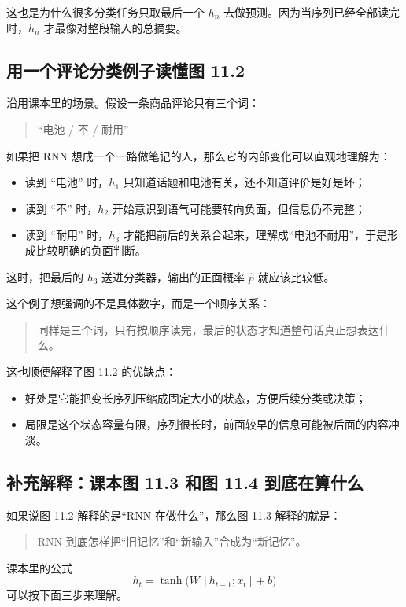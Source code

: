 \documentclass[12pt,a4paper]{ctexart}
\begin{document}
这也是为什么很多分类任务只取最后一个 \(h_n\) 去做预测。因为当序列已经全部读完时，\(h_n\) 才最像对整段输入的总摘要。

\subsection{用一个评论分类例子读懂图 11.2}

沿用课本里的场景。假设一条商品评论只有三个词：
\begin{quote}
“电池 / 不 / 耐用”
\end{quote}

如果把 RNN 想成一个一路做笔记的人，那么它的内部变化可以直观地理解为：
\begin{itemize}
  \item 读到 “电池” 时，\(h_1\) 只知道话题和电池有关，还不知道评价是好是坏；
  \item 读到 “不” 时，\(h_2\) 开始意识到语气可能要转向负面，但信息仍不完整；
  \item 读到 “耐用” 时，\(h_3\) 才能把前后的关系合起来，理解成“电池不耐用”，于是形成比较明确的负面判断。
\end{itemize}

这时，把最后的 \(h_3\) 送进分类器，输出的正面概率 \(\hat p\) 就应该比较低。

这个例子想强调的不是具体数字，而是一个顺序关系：
\begin{quote}
同样是三个词，只有按顺序读完，最后的状态才知道整句话真正想表达什么。
\end{quote}

这也顺便解释了图 11.2 的优缺点：
\begin{itemize}
  \item 好处是它能把变长序列压缩成固定大小的状态，方便后续分类或决策；
  \item 局限是这个状态容量有限，序列很长时，前面较早的信息可能被后面的内容冲淡。
\end{itemize}

\subsection{补充解释：课本图 11.3 和图 11.4 到底在算什么}

如果说图 11.2 解释的是“RNN 在做什么”，那么图 11.3 解释的就是：
\begin{quote}
RNN 到底怎样把“旧记忆”和“新输入”合成为“新记忆”。
\end{quote}

课本里的公式
\[
h_t = \tanh\!\bigl(W\,[h_{t-1};x_t] + b\bigr)
\]
可以按下面三步来理解。
\end{document}
